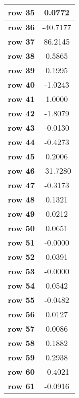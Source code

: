 \begin{tiny}
\begin{tabular}{|l|c|}
\textbf{row 35}&0.0772\\\hline
\textbf{row 36}&-40.7177\\\hline
\textbf{row 37}&86.2145\\\hline
\textbf{row 38}&0.5865\\\hline
\textbf{row 39}&0.1995\\\hline
\textbf{row 40}&-1.0243\\\hline
\textbf{row 41}&1.0000\\\hline
\textbf{row 42}&-1.8079\\\hline
\textbf{row 43}&-0.0130\\\hline
\textbf{row 44}&-0.4273\\\hline
\textbf{row 45}&0.2006\\\hline
\textbf{row 46}&-31.7280\\\hline
\textbf{row 47}&-0.3173\\\hline
\textbf{row 48}&0.1321\\\hline
\textbf{row 49}&0.0212\\\hline
\textbf{row 50}&0.0651\\\hline
\textbf{row 51}&-0.0000\\\hline
\textbf{row 52}&0.0391\\\hline
\textbf{row 53}&-0.0000\\\hline
\textbf{row 54}&0.0542\\\hline
\textbf{row 55}&-0.0482\\\hline
\textbf{row 56}&0.0127\\\hline
\textbf{row 57}&0.0086\\\hline
\textbf{row 58}&0.1882\\\hline
\textbf{row 59}&0.2938\\\hline
\textbf{row 60}&-0.4021\\\hline
\textbf{row 61}&-0.0916\\\hline
\end{tabular}
\end{tiny}